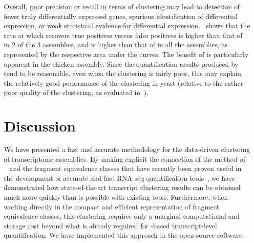 Overall, poor precision or recall in terms of clustering may lead to detection of fewer truly differentially expressed genes, spurious identification of differential expression, or weak statistical evidence for differential expression.~ shows that the rate at which \rapclust recovers true positives versus false positives is higher than that of \cdhit in $2$ of the $3$ assemblies, and is higher than that of \corset in all the assemblies, as represented by the respective area under the curves. The benefit of \rapclust is particularly apparent in the chicken assembly. Since the quantification results produced by \sailfish tend to be reasonable, even when the clustering is fairly poor, this may explain the relatively good performance of the \cdhit clustering in yeast (relative to the rather poor quality of the clustering, as evaluated in~).

\section{Discussion}
\label{sec:conclusion}

We have presented a fast and accurate methodology for the data-driven clustering of \denovo transcriptome assemblies. By making explicit the connection of the method of \corset~\citep{corset} and the fragment equivalence classes that have recently been proven useful in the development of accurate and fast RNA-seq quantification tools~\cite{sailfish, salmon, kallisto}, we have demonstrated how state-of-the-art transcript clustering results can be obtained much more quickly than is possible with existing tools. Furthermore, when working directly in the compact and efficient representation of fragment equivalence classes, this clustering requires only a marginal computational and storage cost beyond what is already required for \qm-based transcript-level quantification. We have implemented this approach in the open-source software \rapclust.


